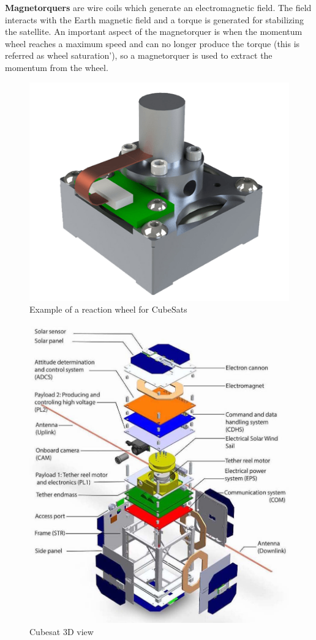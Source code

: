 \textbf{Magnetorquers} are wire coils which generate an electromagnetic field. The field interacts with the Earth magnetic field and a torque is generated for stabilizing the satellite. An important aspect of the magnetorquer is when the momentum wheel reaches a maximum speed and can no longer produce the torque (this is referred as wheel saturation'), so a magnetorquer is used to extract the momentum from the wheel.
%
\begin{table}[H]
	\begin{minipage}[b]{0.49\linewidth}
		\centering
		\begin{figure}[H]
			\centering
			\includegraphics[width=0.5\linewidth]{figures/MW}
			\caption{Example of a reaction wheel for CubeSats}
			\label{fig:MW}
		\end{figure}
	\end{minipage}\hfill
	\begin{minipage}[b]{0.49\linewidth}
		\centering
		\begin{figure}[H]
			\centering
			\includegraphics[width=1\linewidth]{figures/cubsat}
			\caption{Cubesat 3D view}
			\label{fig:cub}
		\end{figure}
	\end{minipage}
\end{table}
